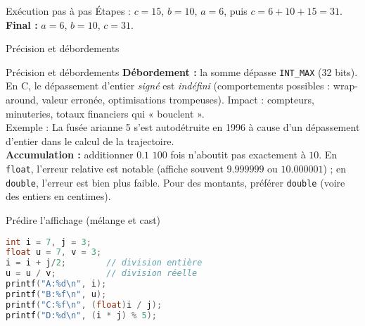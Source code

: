 \begin{UPSTIprofOnlyEnv}
  \begin{UPSTIcorrectionP}{Exécution pas à pas}
    Étapes : $c=15$, $b=10$, $a=6$, puis $c=6+10+15=31$.  
    \textbf{Final :} $a=6$, $b=10$, $c=31$.
  \end{UPSTIcorrectionP}
\end{UPSTIprofOnlyEnv}

\begin{UPSTIexercice}{Précision et débordements}
\end{UPSTIexercice}

\begin{UPSTIprofOnlyEnv}
  \begin{UPSTIcorrectionP}{Précision et débordements}
    \textbf{Débordement :} la somme dépasse \texttt{INT\_MAX} (32 bits). En C, le dépassement d’entier \emph{signé} est \textit{indéfini} (comportements possibles : wrap-around, valeur erronée, optimisations trompeuses). Impact : compteurs, minuteries, totaux financiers qui « bouclent ».  \\
    Exemple : La fusée arianne 5 s’est autodétruite en 1996 à cause d’un dépassement d’entier dans le calcul de la trajectoire.\\
    \textbf{Accumulation :} additionner $0.1$ $100$ fois n’aboutit pas exactement à $10$. En \texttt{float}, l’erreur relative est notable (affiche souvent $9.999999$ ou $10.000001$) ; en \texttt{double}, l’erreur est bien plus faible. Pour des montants, préférer \texttt{double} (voire des entiers en centimes).
  \end{UPSTIcorrectionP}
\end{UPSTIprofOnlyEnv}

\begin{UPSTIexercice}{Prédire l'affichage (mélange et cast)}
\begin{lstlisting}[language=C]
int i = 7, j = 3;
float u = 7, v = 3;
i = i + j/2;        // division entière
u = u / v;          // division réelle
printf("A:%d\n", i);
printf("B:%f\n", u);
printf("C:%f\n", (float)i / j);
printf("D:%d\n", (i * j) % 5);
\end{lstlisting}
\end{UPSTIexercice}

